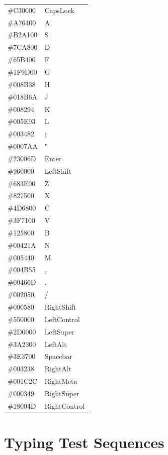 \documentclass{report}
\begin{document}
\begin{supertabular}{ll}
	\#C30000 & CapsLock          \\
	\#A76400 & A								 \\
	\#B2A100 & S								 \\
	\#7CA800 & D								 \\
	\#65B400 & F								 \\
	\#1F9D00 & G								 \\
	\#008B38 & H								 \\
	\#018B6A & J								 \\
	\#008294 & K								 \\
	\#005E93 & L								 \\
	\#003482 & :								 \\
	\#0007AA & "								 \\
	\#23006D & Enter						 \\

	\#960000 & LeftShift         \\
	\#683E00 & Z								 \\
	\#827500 & X								 \\
	\#4D6800 & C								 \\
	\#3F7100 & V								 \\
	\#125800 & B								 \\
	\#00421A & N								 \\
	\#005440 & M								 \\
	\#004B55 & ,								 \\
	\#00466D & .								 \\
	\#002050 & /								 \\
	\#000580 & RightShift				 \\

	\#550000 & LeftControl       \\
	\#2D0000 & LeftSuper         \\
	\#3A2300 & LeftAlt           \\
	\#3E3700 & Spacebar					 \\
	\#003238 & RightAlt					 \\
	\#001C2C & RightMeta 				 \\
	\#000349 & RightSuper				 \\
	\#18004D & RightControl 		 \\
\end{supertabular}

\onecolumn
\chapter{Typing Test Sequences}
\label{appendix:test-sequences}
\end{document}
